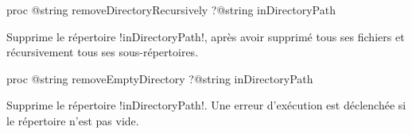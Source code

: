 

\begin{galgasbox}
proc @string removeDirectoryRecursively ?@string inDirectoryPath
\end{galgasbox}

Supprime le répertoire \ggs!inDirectoryPath!, après avoir supprimé tous ses fichiers et récursivement tous ses sous-répertoires.









\begin{galgasbox}
proc @string removeEmptyDirectory ?@string inDirectoryPath
\end{galgasbox}

Supprime le répertoire \ggs!inDirectoryPath!. Une erreur d'exécution est déclenchée si le répertoire n'est pas vide.


